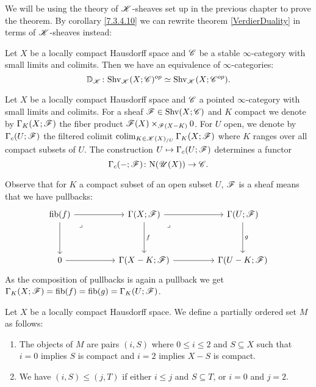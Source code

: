 \documentclass[../../thesis.tex]{subfiles}
\begin{document}
We will be using the theory of $\mathscr{K}$-sheaves set up in the previous chapter to prove the theorem.
By corollary \ref{7.3.4.10} we can rewrite theorem \ref{VerdierDuality} in terms of $\mathscr{K}$-sheaves instead:
\begin{theorem}\label{KVerdierDuality}
    Let $X$ be a locally compact Hausdorff space and $\mathscr{C}$ be a stable $\infty$-category with small limits and colimits.
    Then we have an equivalence of $\infty$-categories:
    \[
        \mathbb{D}_{\mathscr{K}} \colon \mathrm{Shv}_{\mathscr{K}}(X;\mathscr{C})^{op} \simeq \mathrm{Shv}_{\mathscr{K}}(X;\mathscr{C}^{op}).
    \]
\end{theorem}
\begin{definition}[{\cite[Definition 5.5.5.9]{HA}}]
    Let $X$ be a locally compact Hausdorff space and $\mathscr{C}$ a pointed $\infty$-category with small limits and colimits.
    For a sheaf $\mathscr{F} \in \mathrm{Shv}(X;\mathscr{C})$ and $K$ compact we denote by $\Gamma_K(X;\mathscr{F})$ the fiber product $\mathscr{F}(X)\times_{\mathscr{F}(X-K)}0$.
    For $U$ open, we denote by $\Gamma_c(U;\mathscr{F})$ the filtered colimit $\operatorname{colim}_{K \in\mathscr{K}(X)_{/U}}\Gamma_K(X;\mathscr{F})$ where $K$ ranges over all compact subsets of $U$.
    The construction $U \mapsto \Gamma_c(U;\mathscr{F})$ determines a functor
    \[
        \Gamma_c({-} ;\mathscr{F}) \colon \mathrm{N}(\mathscr{U}(X)) \to \mathscr{C} .
    \]
\end{definition}
\begin{remark}\label{GammaKXisGammaKU}
    Observe that for $K$ a compact subset of an open subset $U$, $\mathscr{F}$ is a sheaf means that we have pullbacks:
    \[\begin{tikzcd}
            {\fib(f)} && {\Gamma(X;\F)} && {\Gamma(U;\F)} \\
            \\
            0 && {\Gamma(X-K;\F)} && {\Gamma(U-K;\F)}
            \arrow[from=1-3, to=1-5]
            \arrow["f", from=1-3, to=3-3]
            \arrow[from=3-3, to=3-5]
            \arrow["g", from=1-5, to=3-5]
            \arrow["\lrcorner"{anchor=center, pos=0.125}, draw=none, from=1-3, to=3-5]
            \arrow[from=1-1, to=3-1]
            \arrow[from=3-1, to=3-3]
            \arrow[from=1-1, to=1-3]
            \arrow["\lrcorner"{anchor=center, pos=0.125}, draw=none, from=1-1, to=3-3]
        \end{tikzcd}\]
    As the composition of pullbacks is again a pullback we get $\Gamma_K(X;\mathscr{F})=\operatorname{fib}(f)=\operatorname{fib}(g)=\Gamma_K(U;\mathscr{F})$.
\end{remark}
\begin{definition}[{\cite[Notation 5.5.5.5]{HA}}]\label{5.5.5.5}
    Let $X$ be a locally compact Hausdorff space.
    We define a partially ordered set $M$ as follows:
    \begin{enumerate}
        \item The objects of $M$ are pairs $(i,S)$ where $0 \leq i \leq 2$ and $S \subseteq X$ such that $i=0$ implies $S$ is compact and $i=2$ implies $X-S$ is compact.
        \item We have $(i,S) \leq (j,T)$ if either $i\leq j$ and $S\subseteq T$, or $i=0$ and $j=2$.
    \end{enumerate}
\end{definition}
\end{document}
